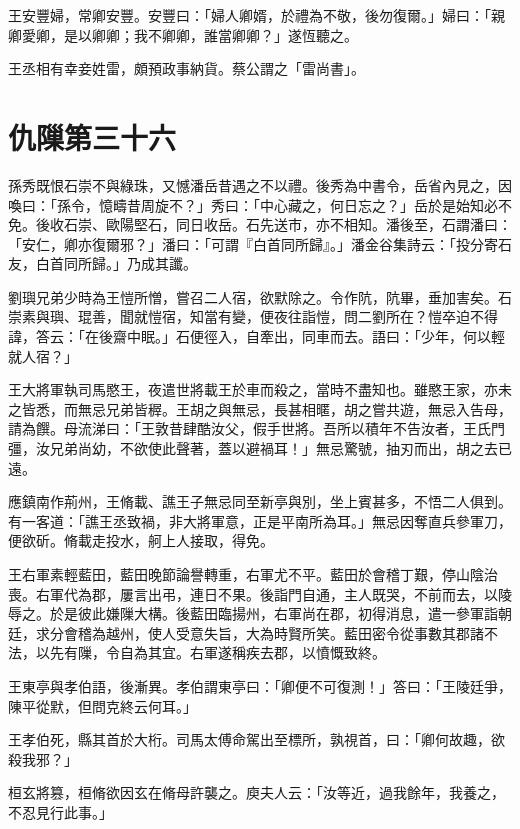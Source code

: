 王安豐婦，常卿安豐。安豐曰：「婦人卿婿，於禮為不敬，後勿復爾。」婦曰：「親卿愛卿，是以卿卿；我不卿卿，誰當卿卿？」遂恆聽之。

王丞相有幸妾姓雷，頗預政事納貨。蔡公謂之「雷尚書」。



\chapter{仇隟第三十六}

孫秀既恨石崇不與綠珠，又憾潘岳昔遇之不以禮。後秀為中書令，岳省內見之，因喚曰：「孫令，憶疇昔周旋不？」秀曰：「中心藏之，何日忘之？」岳於是始知必不免。後收石崇、歐陽堅石，同日收岳。石先送市，亦不相知。潘後至，石謂潘曰：「安仁，卿亦復爾邪？」潘曰：「可謂『白首同所歸』。」潘金谷集詩云：「投分寄石友，白首同所歸。」乃成其讖。

劉璵兄弟少時為王愷所憎，嘗召二人宿，欲默除之。令作阬，阬畢，垂加害矣。石崇素與璵、琨善，聞就愷宿，知當有變，便夜往詣愷，問二劉所在？愷卒迫不得諱，答云：「在後齋中眠。」石便徑入，自牽出，同車而去。語曰：「少年，何以輕就人宿？」

王大將軍執司馬愍王，夜遣世將載王於車而殺之，當時不盡知也。雖愍王家，亦未之皆悉，而無忌兄弟皆稺。王胡之與無忌，長甚相暱，胡之嘗共遊，無忌入告母，請為饌。母流涕曰：「王敦昔肆酷汝父，假手世將。吾所以積年不告汝者，王氏門彊，汝兄弟尚幼，不欲使此聲著，蓋以避禍耳！」無忌驚號，抽刃而出，胡之去已遠。

應鎮南作荊州，王脩載、譙王子無忌同至新亭與別，坐上賓甚多，不悟二人俱到。有一客道：「譙王丞致禍，非大將軍意，正是平南所為耳。」無忌因奪直兵參軍刀，便欲斫。脩載走投水，舸上人接取，得免。

王右軍素輕藍田，藍田晚節論譽轉重，右軍尤不平。藍田於會稽丁艱，停山陰治喪。右軍代為郡，屢言出弔，連日不果。後詣門自通，主人既哭，不前而去，以陵辱之。於是彼此嫌隟大構。後藍田臨揚州，右軍尚在郡，初得消息，遣一參軍詣朝廷，求分會稽為越州，使人受意失旨，大為時賢所笑。藍田密令從事數其郡諸不法，以先有隟，令自為其宜。右軍遂稱疾去郡，以憤慨致終。

王東亭與孝伯語，後漸異。孝伯謂東亭曰：「卿便不可復測！」答曰：「王陵廷爭，陳平從默，但問克終云何耳。」

王孝伯死，縣其首於大桁。司馬太傅命駕出至標所，孰視首，曰：「卿何故趣，欲殺我邪？」

桓玄將篡，桓脩欲因玄在脩母許襲之。庾夫人云：「汝等近，過我餘年，我養之，不忍見行此事。」



